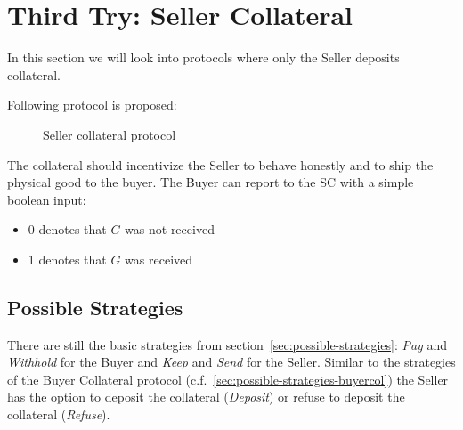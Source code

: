 \documentclass{cacthesis}
\begin{document}
\section{Third Try: Seller Collateral}
\label{sec:seller-col}
In this section we will look into protocols where only the Seller deposits collateral.\newline

Following protocol is proposed:
\begin{figure}[htb!]
    \centering
    \caption{Seller collateral protocol}
    \label{pro:seller-col}
\end{figure}

The collateral should incentivize the Seller to behave honestly and to ship the
physical good to the buyer. The Buyer can report to the SC with a simple boolean input:
\begin{itemize}
    \item 0 denotes that $G$ was not received
    \item 1 denotes that $G$ was received
\end{itemize}
\subsection{Possible Strategies}
\label{sec:possible-strategies-sellercol}
There are still the basic strategies from section~\ref{sec:possible-strategies}: \emph{Pay} and \emph{Withhold} for the Buyer and \emph{Keep} and \emph{Send} for the Seller. Similar to the strategies of the Buyer Collateral protocol (c.f.~\ref{sec:possible-strategies-buyercol}) the Seller has the option to deposit the collateral (\emph{Deposit}) or refuse to deposit the collateral (\emph{Refuse}).\newline
\end{document}
